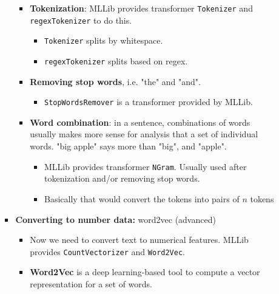 \begin{multicols}{2}
\begin{itemize}
\begin{itemize}
\begin{itemize}
      \begin{itemize}
            \item
        \textbf{Tokenization}: MLLib provides transformer
        \texttt{Tokenizer} and \texttt{regexTokenizer} to do this.

        \begin{itemize}
                \item
          \texttt{Tokenizer} splits by whitespace.
        \item
          \texttt{regexTokenizer} splits based on regex.
        \end{itemize}
      \item
        \textbf{Removing stop words}, i.e. "the" and "and".

        \begin{itemize}
                \item
          \texttt{StopWordsRemover} is a transformer provided by MLLib.
        \end{itemize}
      \item
        \textbf{Word combination}: in a sentence, combinations of words
        usually makes more sense for analysis that a set of individual
        words. "big apple" says more than "big", and "apple".

        \begin{itemize}
                \item
          MLLib provides transformer \texttt{NGram}. Usually used after
          tokenization and/or removing stop words.
        \item
          Basically that would convert the tokens into pairs of {\(n\)}
          tokens
        \end{itemize}
      \end{itemize}
    \item
      \textbf{Converting to number data:} word2vec (advanced)

      \begin{itemize}
            \item
        Now we need to convert text to numerical features. MLLib
        provides \texttt{CountVectorizer} and \texttt{Word2Vec}.
      \item
        \textbf{Word2Vec} is a deep learning-based tool to compute a
        vector representation for a set of words.


\end{itemize}
\end{itemize}
\end{itemize}
\end{itemize}
\end{multicols}
